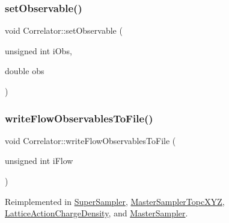 \subsubsection{\texorpdfstring{setObservable()}{setObservable()}}
{\footnotesize\ttfamily void Correlator\+::set\+Observable (\begin{DoxyParamCaption}\item[{unsigned int}]{i\+Obs,  }\item[{double}]{obs }\end{DoxyParamCaption})\hspace{0.3cm}{\ttfamily [virtual]}}

\mbox{\label{class_correlator_a168512b2ce182d9478db47f100125fa6}} 
\subsubsection{\texorpdfstring{writeFlowObservablesToFile()}{writeFlowObservablesToFile()}}
{\footnotesize\ttfamily void Correlator\+::write\+Flow\+Observables\+To\+File (\begin{DoxyParamCaption}\item[{unsigned int}]{i\+Flow }\end{DoxyParamCaption})\hspace{0.3cm}{\ttfamily [virtual]}}



Reimplemented in \mbox{\hyperlink{class_super_sampler_a410b650ebccdb03519c88908a3a8013e}{Super\+Sampler}}, \mbox{\hyperlink{class_master_sampler_topc_x_y_z_a4fba4290e4406e18ef3f2904c6ae364f}{Master\+Sampler\+Topc\+X\+YZ}}, \mbox{\hyperlink{class_lattice_action_charge_density_a54226556dc1497c311e4a4d50bf44c26}{Lattice\+Action\+Charge\+Density}}, and \mbox{\hyperlink{class_master_sampler_ad475928217ac61fae134128904aaa9f8}{Master\+Sampler}}.

